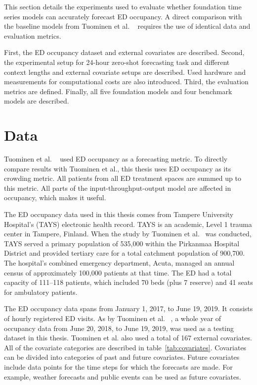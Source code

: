 This section details the experiments used to evaluate whether foundation time series models can accurately forecast ED occupancy. A direct comparison with the baseline models from Tuominen et al. ~\cite{tuominen_forecasting_2024} requires the use of identical data and evaluation metrics.

First, the ED occupancy dataset and external covariates are described. Second, the experimental setup for 24-hour zero-shot forecasting task and different context lengths and external covariate setups are described. Used hardware and measurements for computational costs are also introduced. Third, the evaluation metrics are defined. Finally, all five foundation models and four benchmark models are described. ~\cite{tuominen_forecasting_2024}

\section{Data}

Tuominen et al. ~\cite{tuominen_forecasting_2024} used ED occupancy as a forecasting metric. To directly compare results with Tuominen et al., this thesis uses ED occupancy as its crowding metric. All patients from all ED treatment spaces are summed up to this metric. All parts of the input-throughput-output model are affected in occupancy, which makes it useful. ~\cite{tuominen_forecasting_2024}

The ED occupancy data used in this thesis comes from Tampere University Hospital's (TAYS) electronic health record. TAYS is an academic, Level 1 trauma center in Tampere, Finland. When the study by Tuominen et al.~\cite{tuominen_forecasting_2024} was conducted, TAYS served a primary population of 535,000 within the Pirkanmaa Hospital District and provided tertiary care for a total catchment population of 900,700. The hospital's combined emergency department, Acuta, managed an annual census of approximately 100,000 patients at that time. The ED had a total capacity of 111–118 patients, which included 70 beds (plus 7 reserve) and 41 seats for ambulatory patients. ~\cite{tuominen_forecasting_2024}

The ED occupancy data spans from January 1, 2017, to June 19, 2019. It consists of hourly registered ED visits. As by Tuominen et al. ~\cite{tuominen_forecasting_2024}, a whole year of occupancy data from June 20, 2018, to June 19, 2019, was used as a testing dataset in this thesis. Tuominen et al. also used a total of 167 external covariates. All of the covariate categories are described in table~\ref{tab:covariates}. Covariates can be divided into categories of past and future covariates. Future covariates include data points for the time steps for which the forecasts are made. For example, weather forecasts and public events can be used as future covariates. ~\cite{tuominen_forecasting_2024}

